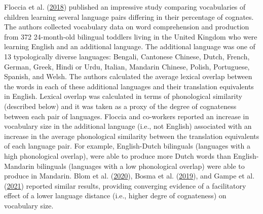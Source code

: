 \documentclass[
]{article}
\begin{document}
Floccia et al. (\protect\hyperlink{ref-floccia2018introduction}{2018})
published an impressive study comparing vocabularies of children
learning several language pairs differing in their percentage of
cognates. The authors collected vocabulary data on word comprehension
and production from 372 24-month-old bilingual toddlers living in the
United Kingdom who were learning English and an additional language. The
additional language was one of 13 typologically diverse languages:
Bengali, Cantonese Chinese, Dutch, French, German, Greek, Hindi or Urdu,
Italian, Mandarin Chinese, Polish, Portuguese, Spanish, and Welsh. The
authors calculated the average lexical overlap between the words in each
of these additional languages and their translation equivalents in
English. Lexical overlap was calculated in terms of phonological
similarity (described below) and it was taken as a proxy of the degree
of cognateness between each pair of languages. Floccia and co-workers
reported an increase in vocabulary size in the additional language
(i.e., not English) associated with an increase in the average
phonological similarity between the translation equivalents of each
language pair. For example, English-Dutch bilinguals (languages with a
high phonological overlap), were able to produce more Dutch words than
English-Mandarin bilinguals (languages with a low phonological overlap)
were able to produce in Mandarin. Blom et al.
(\protect\hyperlink{ref-blom2020crosslanguage}{2020}), Bosma et al.
(\protect\hyperlink{ref-bosma2019longitudinal}{2019}), and Gampe et al.
(\protect\hyperlink{ref-gampe2021does}{2021}) reported similar results,
providing converging evidence of a facilitatory effect of a lower
language distance (i.e., higher degre of cognateness) on vocabulary
size.
\end{document}
